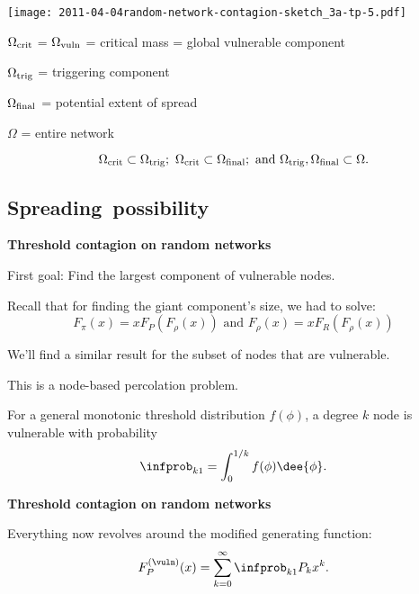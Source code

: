       
    \texttt{[image: 2011-04-04random-network-contagion-sketch\_3a-tp-5.pdf]}
    
    
     
      $\Omega_{\textnormal{crit}}$ = $\Omega_{\textnormal{vuln}}$ = critical mass = global vulnerable component
     
      $\Omega_{\textnormal{trig}}$ = triggering component
     
      $\Omega_{\textnormal{final}}$ = potential extent of spread
     
      $\Omega$ = entire network
    
    \bigskip
  $$
  \Omega_{\textnormal{crit}} 
  \subset
  \Omega_{\textnormal{trig}};
  \
  \Omega_{\textnormal{crit}} 
  \subset
  \Omega_{\textnormal{final}};
  \
  \mbox{and}
  \
  \Omega_{\textnormal{trig}},
  \Omega_{\textnormal{final}} 
  \subset
  \Omega.
  $$

\subsection{Spreading\ possibility}

  \textbf{Threshold contagion on random networks}

  
   
    \alert{First goal:} 
    Find the largest component of vulnerable nodes.
   
    Recall that for finding the giant component's size, 
    we had to solve:
    $$
    {
      F_{\pi}(x)
      =
      x F_{P}
      \left(
        F_{\rho} (x)
      \right)
    }
    \mbox{\ \  and \ }
    {
      F_{\rho}(x)
      =
      x F_{R}
      \left(
        F_{\rho} (x)
      \right)
    }
    $$
   
    We'll find a similar result for 
    the subset of nodes that are vulnerable.
   
    This is a node-based percolation problem.
   
    For a general monotonic threshold distribution \alert{$f(\phi)$},
    a degree $k$ node is vulnerable with probability
    $$
    \infprob_{k1} = \int_{0}^{1/k} f(\phi) \dee{\phi}.
    $$
  


  \textbf{Threshold contagion on random networks}

  
  
    Everything now revolves around the \alert{modified} generating function:
    $$
    F_P^{(\vuln)}(x) 
    = 
    \sum_{k=0}^{\infty}
    \infprob_{k1}
    P_k
    x^k.
    $$
  
